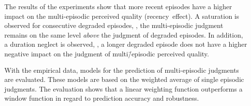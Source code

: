 The results of the experiments show that more recent episodes have a higher impact on the multi-episodic perceived quality (recency~effect). 
A saturation is observed for consecutive degraded episodes, \ie, the multi-episodic judgment remains on the same level \emph{above} the judgment of degraded episodes.
In addition, a duration neglect is observed, \ie, a longer degraded episode does not have a higher negative impact on the judgment of multi\=/episodic perceived quality. 


With the empirical data, models for the prediction of multi-episodic judgments are evaluated.
These models are based on the weighted average of single episodic judgments.
The evaluation shows that a linear weighting function outperforms a window function in regard to prediction accuracy and robustness.


